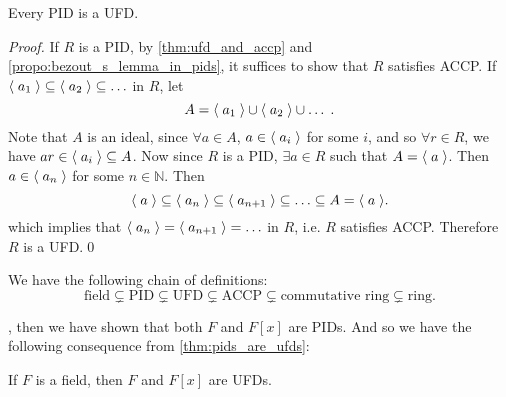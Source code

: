 \begin{thm}
\label{thm:pids_are_ufds}
  Every PID is a UFD.
\end{thm}

\begin{proof}
  If $R$ is a PID, by \cref{thm:ufd_and_accp} and \cref{propo:bezout_s_lemma_in_pids}, it suffices to show that $R$ satisfies ACCP. If $\langle \; a_1 \; \rangle \subseteq \langle \; a_2 \; \rangle \subseteq \hdots$ in $R$, let
  \begin{equation*}
    A = \langle \; a_1 \; \rangle \cup \langle \; a_2 \; \rangle \cup \hdots \;.
  \end{equation*}
  Note that $A$ is an ideal, since $\forall a \in A$, $a \in \langle \; a_i \; \rangle$ for some $i$, and so $\forall r \in R$, we have $ar \in \langle \; a_i \; \rangle \subseteq A$. Now since $R$ is a PID, $\exists a \in R$ such that $A = \langle \; a \; \rangle$. Then $a \in \langle \; a_n \; \rangle$ for some $n \in \mathbb{N}$. Then
  \begin{equation*}
    \langle \; a \; \rangle \subseteq \langle \; a_n \; \rangle \subseteq \langle \; a_{n + 1} \; \rangle \subseteq \hdots \subseteq A = \langle \; a \; \rangle.
  \end{equation*}
  which implies that $\langle \; a_n \; \rangle = \langle \; a_{n + 1} \; \rangle = \hdots$ in $R$, i.e. $R$ satisfies ACCP. Therefore $R$ is a UFD.\qed
\end{proof}

\begin{note}
  We have the following chain of definitions:
  \begin{equation*}
    \text{field} \subsetneq \text{PID} \subsetneq \text{UFD} \subsetneq \text{ACCP} \subsetneq \text{commutative ring} \subsetneq \text{ring}.
  \end{equation*}
\end{note}

, then we have shown that both $F$ and $F[x]$ are PIDs. And so we have the following consequence from \cref{thm:pids_are_ufds}:

\begin{crly}
\label{crly:polynomial_rings_over_a_field_is_a_ufd}
If $F$ is a field, then $F$ and $F[x]$ are UFDs.
\end{crly}

